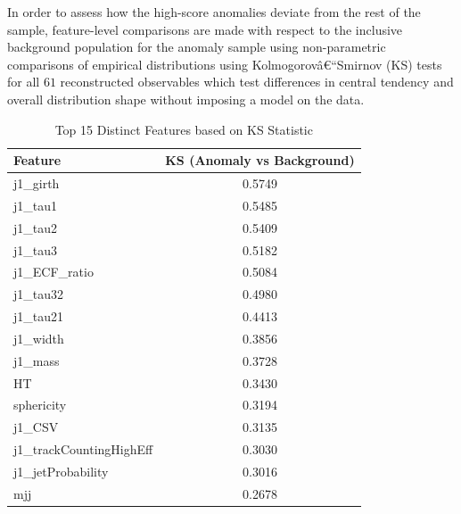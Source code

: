 \documentclass[11pt,a4paper,twocolumn]{article}
\begin{document}
In order to assess how the high-score anomalies deviate from the rest of the sample, feature-level comparisons are made with respect to the inclusive background population for the anomaly sample using non-parametric comparisons of empirical distributions using Kolmogorovâ€“Smirnov (KS) tests for all $61$ reconstructed observables which test differences in central tendency and overall distribution shape without imposing a model on the data. 

\begin{table}[t]
\centering
\caption{Top 15 Distinct Features based on KS Statistic}
\label{tab:ks_top15}
\renewcommand{\arraystretch}{1.15}
\begin{tabular}{lc}
\hline
\textbf{Feature} & \textbf{KS (Anomaly vs Background)} \\
\hline
j1\_girth                  & 0.5749 \\
j1\_tau1                   & 0.5485 \\
j1\_tau2                   & 0.5409 \\
j1\_tau3                   & 0.5182  \\
j1\_ECF\_ratio              & 0.5084  \\
j1\_tau32                  & 0.4980  \\
j1\_tau21                  & 0.4413  \\
j1\_width                  & 0.3856  \\
j1\_mass                   & 0.3728  \\
HT                          & 0.3430  \\
sphericity                 & 0.3194  \\
j1\_CSV                    & 0.3135  \\
j1\_trackCountingHighEff   & 0.3030  \\
j1\_jetProbability         & 0.3016  \\
mjj                         & 0.2678  \\
\hline
\end{tabular}
\end{table}
\end{document}
